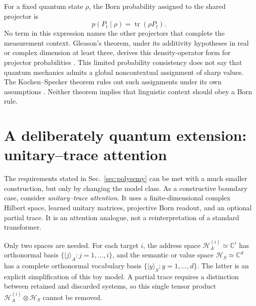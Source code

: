 \documentclass[
  aps,
  reprint,
  superscriptaddress,
  floatfix,
  nofootinbib,
  longbibliography
]{revtex4-2}
\begin{document}
For a fixed quantum state $\rho$, the Born probability assigned to the shared
projector is
\begin{equation}
 p(P_t\mid\rho)=\operatorname{tr}(\rho P_t).
 \label{eq:born-shared-app}
\end{equation}
No term in this expression names the other projectors that complete the
measurement context.  Gleason's theorem, under its additivity hypotheses in
real or complex dimension at least three, derives this density-operator form
for projector probabilities \cite{Gleason}.  This limited probability
consistency does not say that quantum mechanics admits a global
noncontextual assignment of sharp values.  The Kochen--Specker theorem rules
out such assignments under its own assumptions \cite{specker-60,kochen1}.
Neither theorem implies that linguistic context should obey a Born rule.


\section{A deliberately quantum extension: unitary--trace attention}
\label{app:quantum-attention}

The requirements stated in Sec.~\ref{sec:polysemy} can be met with a much
smaller construction, but only by changing the model class.
As a constructive boundary case, consider \emph{unitary--trace attention}.
It uses a finite-dimensional complex Hilbert space, learned unitary matrices,
projective Born readout, and an optional partial trace.  It is an attention
analogue, not a reinterpretation of a standard transformer.

Only two spaces are needed.  For each target $i$, the address space
$\mathcal H_A^{(i)}\simeq\mathbb C^i$ has orthonormal basis
$\{|j\rangle_A:j=1,\ldots,i\}$, and the semantic or value space
$\mathcal H_S\simeq\mathbb C^d$ has a complete orthonormal vocabulary basis
$\{|y\rangle_S:y=1,\ldots,d\}$.  The latter is an explicit simplification of
this toy model.  A partial trace requires a distinction between retained and
discarded systems, so this single tensor product
$\mathcal H_A^{(i)}\otimes\mathcal H_S$ cannot be removed.
\end{document}
